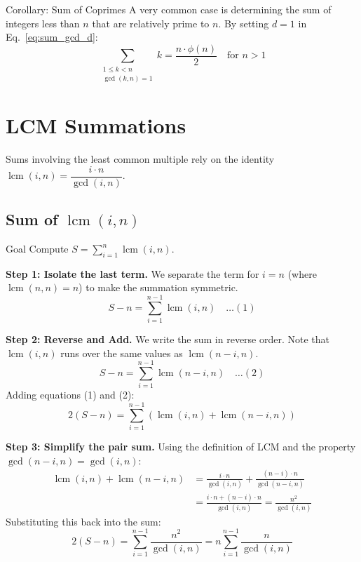 \documentclass[11pt]{article}
\DeclareMathOperator{\lcm}{lcm}
\begin{document}
\begin{conceptbox}{Corollary: Sum of Coprimes}
    A very common case is determining the sum of integers less than $n$ that are relatively prime to $n$. By setting $d=1$ in Eq.~\eqref{eq:sum_gcd_d}:
    \begin{equation}
        \sum_{\substack{1 \le k < n \\ \gcd(k, n) = 1}} k = \frac{n \cdot \phi(n)}{2} \quad \text{for } n > 1
    \end{equation}
\end{conceptbox}

\pagebreak
\section{LCM Summations}
\label{sec:lcm_summation}

Sums involving the least common multiple rely on the identity $\lcm(i, n) = \dfrac{i \cdot n}{\gcd(i, n)}$.

\subsection{Sum of \texorpdfstring{$\operatorname{lcm}(i, n)$}{lcm(i, n)}}

\begin{conceptbox}{Goal}
    Compute $S = \sum_{i=1}^n \lcm(i, n)$.
\end{conceptbox}

\textbf{Step 1: Isolate the last term.}
We separate the term for $i=n$ (where $\lcm(n, n) = n$) to make the summation symmetric.
\[ S - n = \sum_{i=1}^{n-1} \lcm(i, n) \quad \dots (1) \]

\textbf{Step 2: Reverse and Add.}
We write the sum in reverse order. Note that $\lcm(i, n)$ runs over the same values as $\lcm(n-i, n)$.
\[ S - n = \sum_{i=1}^{n-1} \lcm(n-i, n) \quad \dots (2) \]
Adding equations (1) and (2):
\[ 2(S - n) = \sum_{i=1}^{n-1} \left( \lcm(i, n) + \lcm(n-i, n) \right) \]

\textbf{Step 3: Simplify the pair sum.}
Using the definition of LCM and the property $\gcd(n-i, n) = \gcd(i, n)$:
\begin{align*}
    \lcm(i, n) + \lcm(n-i, n) & = \frac{i \cdot n}{\gcd(i, n)} + \frac{(n-i) \cdot n}{\gcd(n-i, n)}     \\
                              & = \frac{i \cdot n + (n-i) \cdot n}{\gcd(i, n)} = \frac{n^2}{\gcd(i, n)}
\end{align*}
Substituting this back into the sum:
\[ 2(S - n) = \sum_{i=1}^{n-1} \frac{n^2}{\gcd(i, n)} = n \sum_{i=1}^{n-1} \frac{n}{\gcd(i, n)} \]
\end{document}
